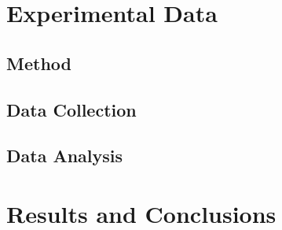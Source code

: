 \documentclass{article}
\begin{document}

\section{Experimental Data}
\subsection{Method} %
\label{Method} 
\subsection{Data Collection} %
\label{Data_Collection} 
\subsection{Data Analysis}%
\label{Data_Analysis} 


\section{Results and Conclusions}







\end{document}
